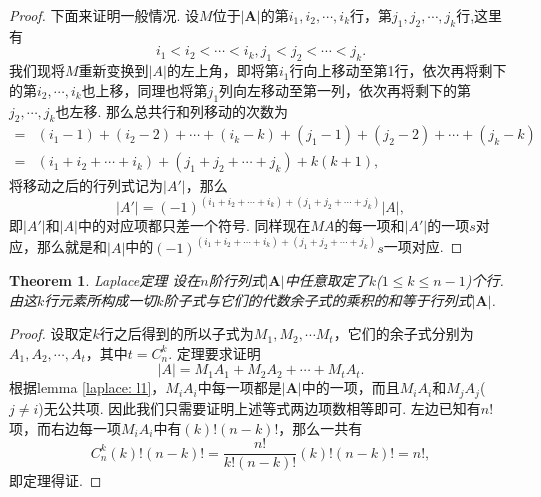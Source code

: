 \documentclass{article}
\newtheorem{theorem}{Theorem}[section]
\newcommand{\mbf}[1]{\mathbf{#1}}
\begin{document}
\begin{proof}
下面来证明一般情况. 设$M$位于$|\mbf{A}|$的第$i_1,i_2,\cdots,i_k$行，第$j_1,j_2,\cdots,j_k$行,这里有
$$
i_1 < i_2 < \cdots < i_k,j_1 < j_2 < \cdots < j_k.
$$
我们现将$M$重新变换到$|A|$的左上角，即将第$i_1$行向上移动至第1行，依次再将剩下的第$i_2,\cdots,i_k$也上移，同理也将第$j_1$列向左移动至第一列，依次再将剩下的第$j_2,\cdots,j_k$也左移. 那么总共行和列移动的次数为
$$
\begin{array}{ll}
=&(i_1-1)+(i_2-2)+\cdots+(i_k-k)+(j_1-1)+(j_2-2)+\cdots+(j_k-k)
\\
=&(i_1 + i_2 + \cdots + i_k) + (j_1 + j_2 + \cdots + j_k) + k(k+1),
\end{array}
$$
将移动之后的行列式记为$|A'|$，那么
$$
|A'| = (-1)^{(i_1 + i_2 + \cdots + i_k) + (j_1 + j_2 + \cdots + j_k)}|A|,
$$
即$|A'|$和$|A|$中的对应项都只差一个符号. 同样现在$MA$的每一项和$|A'|$的一项$s$对应，那么就是和$|A|$中的$(-1)^{(i_1 + i_2 + \cdots + i_k) + (j_1 + j_2 + \cdots + j_k)}s$一项对应.
\end{proof}

\begin{theorem}
\rm {\color{red} Laplace定理} 设在$n$阶行列式$|\mbf{A}|$中任意取定了$k$($1\leq k \leq n-1$)个行. 由这$k$行元素所构成一切$k$阶子式与它们的代数余子式的乘积的和等于行列式$|\mbf{A}|$.
\end{theorem}

\begin{proof}
设取定$k$行之后得到的所以子式为$M_1,M_2,\cdots M_t$，它们的余子式分别为$A_1,A_2,\cdots,A_t$，其中$t=C_n^k$. 定理要求证明
$$
|A| = M_1A_1 + M_2A_2 + \cdots + M_tA_t.
$$
根据lemma \ref{laplace: l1}，$M_iA_i$中每一项都是$|\mbf{A}|$中的一项，而且$M_iA_i$和$M_jA_j$($j \neq i$)无公共项. {\color{blue}因此我们只需要证明上述等式两边项数相等即可}. 左边已知有$n!$项，而右边每一项$M
_iA_i$中有$(k)!(n-k)!$，那么一共有
$$
C_n^k (k)!(n-k)! = \frac{n!}{k!(n-k)!}(k)!(n-k)! = n!,
$$
即定理得证.
\end{proof}


\newpage
\end{document}
